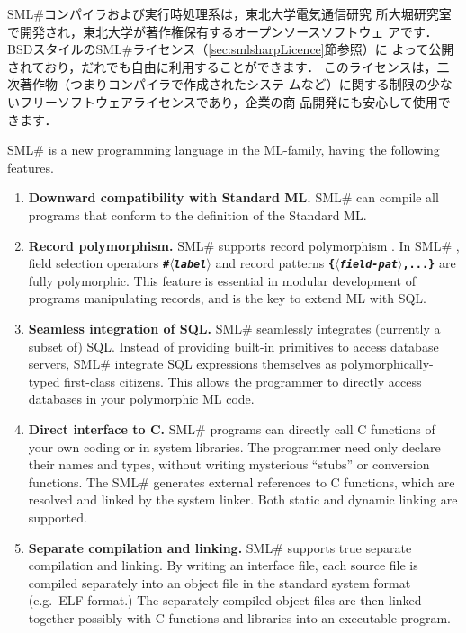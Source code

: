 \documentclass{jbook}
\newcommand{\smlsharp}{SML\#}
\newcommand{\nonterm}[1]{\mbox{$\langle$}{\it #1}\mbox{$\rangle$}}
\begin{document}
	\smlsharp{}コンパイラおよび実行時処理系は，東北大学電気通信研究
所大堀研究室で開発され，東北大学が著作権保有するオープンソースソフトウェ
アです．
	BSDスタイルの\smlsharp{}ライセンス（\ref{sec:smlsharpLicence}節参照）に
よって公開されており，だれでも自由に利用することができます．
	このライセンスは，二次著作物（つまりコンパイラで作成されたシステ
ムなど）に関する制限の少ないフリーソフトウェアライセンスであり，企業の商
品開発にも安心して使用できます．

\else%
	\smlsharp{} is a new programming language in the ML-family,
having the following features.
\begin{enumerate}
\item {\bf Downward compatibility with Standard ML.}
	\smlsharp{} can compile all programs that conform to the
definition of the Standard ML\cite{sml}.

\item {\bf Record polymorphism.}
	\smlsharp{} supports record polymorphism \cite{ohor95toplas}.
	In \smlsharp{} , field selection operators {\bf\tt \#\nonterm{label}}
and record patterns {\bf\tt \{\nonterm{field-pat},...\}} are fully
polymorphic.
	This feature is essential in modular development of programs
manipulating records, and is the key to extend ML with SQL.

\item {\bf Seamless integration of SQL.}
	\smlsharp{} seamlessly integrates (currently a subset of) SQL.
	Instead of providing built-in primitives to access
database servers, \smlsharp{} integrate SQL expressions themselves as
polymorphically-typed first-class citizens.
	This allows the programmer to directly access databases in
your polymorphic ML code.

\item {\bf Direct interface to C.}
	\smlsharp{} programs can directly call C functions of your own
coding or in system libraries.
	The programmer need only declare their names and types, without
writing mysterious ``stubs'' or conversion functions. 
	The \smlsharp{} generates external references to C functions,
which are resolved and linked by the system linker.
	Both static and dynamic linking are supported.

\item {\bf Separate compilation and linking.}
	\smlsharp{} supports true separate compilation and linking.
	By writing an interface file, each source file is compiled
separately into an object file in the standard system format (e.g.\ ELF
format.)
	The separately compiled object files are then linked together
possibly with C functions and libraries into an executable program.


\end{enumerate}
\end{document}
